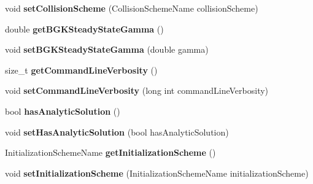 \begin{DoxyCompactItemize}
\item 
\hypertarget{classnatrium_1_1SolverConfiguration_a5e7241337aa70cbe4b8af29c9cb5cfe8}{
void {\bfseries setCollisionScheme} (CollisionSchemeName collisionScheme)}
\label{classnatrium_1_1SolverConfiguration_a5e7241337aa70cbe4b8af29c9cb5cfe8}

\item 
\hypertarget{classnatrium_1_1SolverConfiguration_a4ebcfcb30f5cb6efb0d9fb3978b9b90f}{
double {\bfseries getBGKSteadyStateGamma} ()}
\label{classnatrium_1_1SolverConfiguration_a4ebcfcb30f5cb6efb0d9fb3978b9b90f}

\item 
\hypertarget{classnatrium_1_1SolverConfiguration_a040a4e68a3ce9502e39deb343586d62b}{
void {\bfseries setBGKSteadyStateGamma} (double gamma)}
\label{classnatrium_1_1SolverConfiguration_a040a4e68a3ce9502e39deb343586d62b}

\item 
\hypertarget{classnatrium_1_1SolverConfiguration_ac1954ee6d225807f947222c437fcd6a4}{
size\_\-t {\bfseries getCommandLineVerbosity} ()}
\label{classnatrium_1_1SolverConfiguration_ac1954ee6d225807f947222c437fcd6a4}

\item 
\hypertarget{classnatrium_1_1SolverConfiguration_a906afb09b544bf2137c0d3bf9214b4a5}{
void {\bfseries setCommandLineVerbosity} (long int commandLineVerbosity)}
\label{classnatrium_1_1SolverConfiguration_a906afb09b544bf2137c0d3bf9214b4a5}

\item 
\hypertarget{classnatrium_1_1SolverConfiguration_a43270017646e2efa400ae84d644ac897}{
bool {\bfseries hasAnalyticSolution} ()}
\label{classnatrium_1_1SolverConfiguration_a43270017646e2efa400ae84d644ac897}

\item 
\hypertarget{classnatrium_1_1SolverConfiguration_ae23ef2513c7b4ed3eacd678e38ff146f}{
void {\bfseries setHasAnalyticSolution} (bool hasAnalyticSolution)}
\label{classnatrium_1_1SolverConfiguration_ae23ef2513c7b4ed3eacd678e38ff146f}

\item 
\hypertarget{classnatrium_1_1SolverConfiguration_afe9fd2087df0ab6066f260bf6bfd03ac}{
InitializationSchemeName {\bfseries getInitializationScheme} ()}
\label{classnatrium_1_1SolverConfiguration_afe9fd2087df0ab6066f260bf6bfd03ac}

\item 
\hypertarget{classnatrium_1_1SolverConfiguration_a4d867b8b8c0c08fc68b95f1a1a52c95d}{
void {\bfseries setInitializationScheme} (InitializationSchemeName initializationScheme)}
\label{classnatrium_1_1SolverConfiguration_a4d867b8b8c0c08fc68b95f1a1a52c95d}


\end{DoxyCompactItemize}
